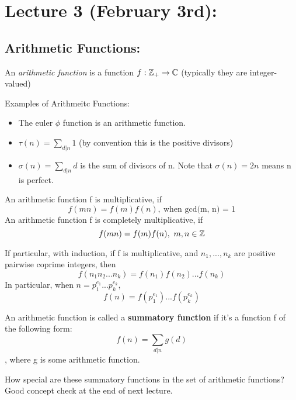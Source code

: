 \section{Lecture 3 (February 3rd):}

\subsection{Arithmetic Functions:}

\begin{definition}
An \textit{arithmetic function} is a function $f: \mathbb{Z}_+ \to \mathbb{C}$ (typically they are integer-valued)
\end{definition}

\begin{example}
Examples of Arithmeitc Functions:
\begin{itemize}
    \item The euler $\phi$ function is an arithmetic function.
    \item $\tau(n) = \sum_{d | n} 1$ (by convention this is the positive divisors)
    \item $\sigma(n) = \sum_{d | n} d$ is the sum of divisors of n. Note that $\sigma(n) = 2n$ means n is perfect.
\end{itemize}
\end{example}

\begin{definition}
An arithmetic function f is multiplicative, if
\[f(mn) = f(m)f(n),\ \text{when gcd(m, n) = 1}\]
An arithmetic function f is completely multiplicative, if
\[f(mn) = f(m)f(n),\ m, n  \in \mathbb{Z}\]
\end{definition}

\begin{remark}
If particular, with induction, if f is multiplicative, and $n_1, ..., n_k$ are positive pairwise coprime integers, then
\[f(n_1n_2...n_k) = f(n_1)f(n_2)...f(n_k)\]
In particular, when $n = p_1^{e_1}...p_k^{e_k}$,
\[f(n) = f(p_1^{e_1})...f(p_k^{e_k})\]
\end{remark}

\begin{definition}
An arithmetic function is called a \textbf{summatory function} if it's a function f of the following form:
\[f(n) = \sum_{d | n} g(d)\]
, where g is some arithmetic function.
\end{definition}

\begin{remark}
How special are these summatory functions in the set of arithmetic functions? Good concept check at the end of next lecture.
\end{remark}

